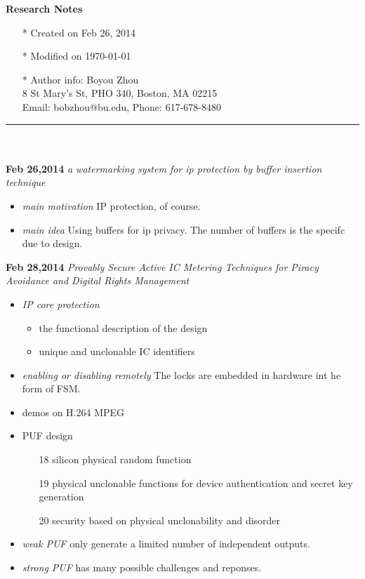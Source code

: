 \documentclass[]{article}
\begin{document}
\pagestyle{empty}
{\large\textbf{Research Notes}}
\begin{itemize}
    \item[*] Created on Feb 26, 2014
    \item[*] Modified on \today
    \item[*] Author info: Boyou Zhou\\
             8 St Mary's St, PHO 340, Boston, MA 02215\\
             Email: bobzhou@bu.edu, Phone: 617-678-8480
\end{itemize}


\rule[-0.1cm]{7.5in}{0.01cm}\\
\\
\noindent \textbf{Feb 26,2014}
\textit{a watermarking system for ip protection by buffer insertion technique}
\indent		\begin{itemize}
            \item \textit{main motivation} IP protection, of course.
            \item \textit{main idea} Using buffers for ip privacy. The number of
            buffers is the specifc due to design.
        \end{itemize}


\noindent \textbf{Feb 28,2014}
\textit{Provably Secure Active IC Metering Techniques for Piracy Avoidance and
Digital Rights Management}
\indent		\begin{itemize}
                \item \textit{IP core protection} 
                    \begin{itemize}
                        \item the functional description of the design
                        \item unique and unclonable IC identifiers
                    \end{itemize}
                \item \textit{enabling or disabling remotely} The locks are embedded
                in hardware int he form of FSM.
                \item demos on H.264 MPEG
                \item PUF design
                    \begin{itemize}
                        \item [18] silicon physical random function
                        \item [19] physical unclonable functions for device
                        authentication and secret key generation
                        \item [20] security based on physical unclonability and
                        disorder
                    \end{itemize}
                \item \textit{weak PUF} only generate a limited number of
                independent outputs.
                \item \textit{strong PUF} has many possible challenges and
                reponses.
        \end{itemize}
\end{document}

